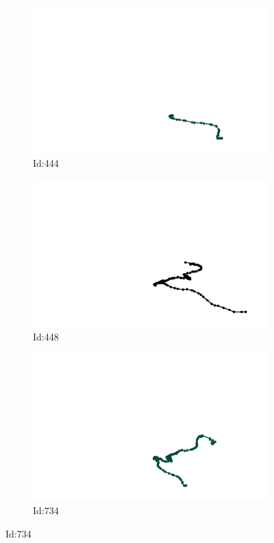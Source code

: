 \documentclass[12pt,twoside]{report}
\begin{document}
\begin{figure}
\centering
\begin{subfigure}[b]{0.20\textwidth}
\centering
\includegraphics[width=\textwidth]{../../trajectories/444.png}
\caption{Id:444}
\end{subfigure}
\begin{subfigure}[b]{0.20\textwidth}
\centering
\includegraphics[width=\textwidth]{../../trajectories/448.png}
\caption{Id:448}
\end{subfigure}
\begin{subfigure}[b]{0.20\textwidth}
\centering
\includegraphics[width=\textwidth]{../../trajectories/734.png}
\caption{Id:734}
\end{subfigure}
\end{figure}
\end{document}
